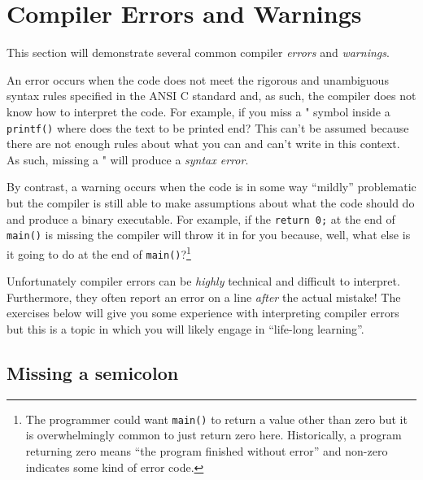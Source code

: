 \documentclass{lab}
\begin{document}
\pagebreak
\section{Compiler Errors and Warnings}

This section will demonstrate several common compiler \textit{errors} and \textit{warnings}.

An error occurs when the code does not meet the rigorous and unambiguous syntax rules specified in the ANSI C standard and, as such, the compiler does not know how to interpret the code. For example, if you miss a " symbol inside a \texttt{printf()} where does the text to be printed end? This can't be assumed because there are not enough rules about what you can and can't write in this context. As such, missing a " will produce a \textit{syntax error}.

By contrast, a warning occurs when the code is in some way ``mildly'' problematic but the compiler is still able to make assumptions about what the code should do and produce a binary executable. For example, if the \texttt{return 0;} at the end of \texttt{main()} is missing the compiler will throw it in for you because, well, what else is it going to do at the end of \texttt{main()}?\footnote{The programmer could want \texttt{main()} to return a value other than zero but it is overwhelmingly common to just return zero here. Historically, a program returning zero means ``the program finished without error'' and non-zero indicates some kind of error code.}

Unfortunately compiler errors can be \textit{highly} technical and difficult to interpret. Furthermore, they often report an error on a line \textit{after} the actual mistake! The exercises below will give you some experience with interpreting compiler errors but this is a topic in which you will likely engage in ``life-long learning''.

\subsection{Missing a semicolon}
\end{document}

